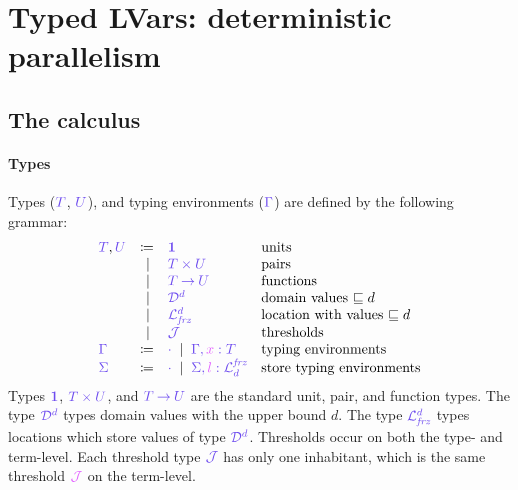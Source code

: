 \documentclass[main.tex]{subfiles}
\begin{document}
\section{Typed LVars: deterministic parallelism}

\subsection{The \typedlambdalvar calculus}


\paragraph*{Types}
Types ($\ty{T}$, $\ty{U}$),  and typing environments ($\ty{\Gamma}$) are defined by the following grammar:
\[
\begin{array}{lrll}
  \ty{T}, \ty{U}
  & \coloneqq & \ty{\tyunit}        & \text{units} \\
  & \sep      & \ty{\typrod{T}{U}}  & \text{pairs} \\
  & \sep      & \ty{\tyfun{T}{U}}   & \text{functions}\\
  & \sep      & \ty{\tyD{d}}        & \text{domain values }{\sqsubseteq d}\\
  & \sep      & \ty{\tyL{\frz}{d}}  & \text{location with values }{\sqsubseteq d}\\
  & \sep      & \ty{\tyJ}           & \text{thresholds}
  \\
  \ty{\Gamma}
  & \coloneqq & \ty{\emptyenv}
    \sep        \ty{\ty{\Gamma},\tmty{x}{T}}
                                    & \text{typing environments}
  \\
  \ty{\Sigma}
  & \coloneqq & \ty{\emptyenv}
    \sep        \ty{\ty{\Sigma},\tmty{l}{\tyL{d}{\frz}}}
                                    & \text{store typing environments}
\end{array}
\]
Types $\ty{\tyunit}$, $\ty{\typrod{T}{U}}$, and $\ty{\tyfun{T}{U}}$ are the standard unit, pair, and function types.
The type $\tyD{d}$ types domain values with the upper bound $d$.
The type $\tyL{\frz}{d}$ types locations which store values of type $\tyD{d}$.
Thresholds occur on both the type- and term-level. Each threshold type $\tyJ$ has only one inhabitant, which is the same threshold $\tmJ$ on the term-level.
\end{document}
